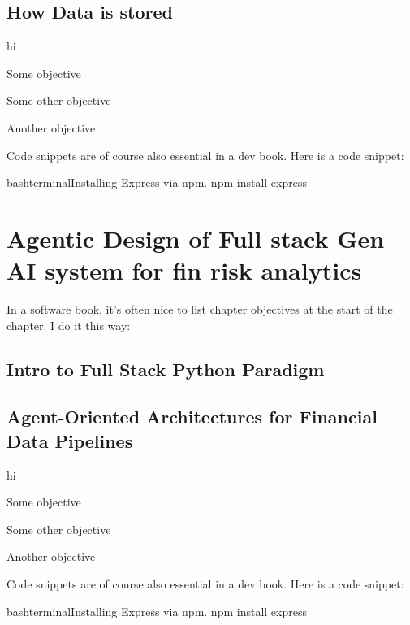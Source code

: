 \documentclass[a4paper,headinclude=on,footinclude=on,12pt,oneside]{scrbook}
\begin{document}
\section{How Data is stored}
hi
\begin{arrows}
	\item Some objective
	\item Some other objective
	\item Another objective
\end{arrows}


Code snippets are of course also essential in a dev book. Here is a code snippet:

\begin{codeInput}{bash}{terminal}{Installing Express via npm.}
	npm install express
\end{codeInput}


\chapter{Agentic Design of Full stack Gen AI system for fin risk analytics}
In a software book, it's often nice to list chapter objectives at the start of the chapter. I do it this way:
\section{Intro to Full Stack Python Paradigm}

\section{Agent-Oriented Architectures for Financial Data Pipelines}
hi
\begin{arrows}
	\item Some objective
	\item Some other objective
	\item Another objective
\end{arrows}


Code snippets are of course also essential in a dev book. Here is a code snippet:

\begin{codeInput}{bash}{terminal}{Installing Express via npm.}
	npm install express
\end{codeInput}
\end{document}
